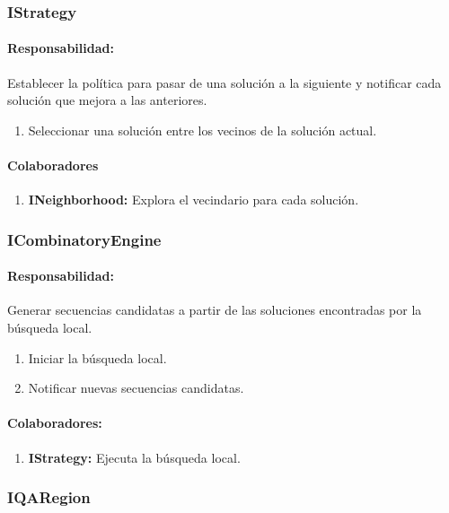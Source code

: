   \subsubsection{IStrategy}
    \paragraph{Responsabilidad:} Establecer la pol\'itica para pasar de una
soluci\'on a la siguiente y notificar cada soluci\'on que mejora a las
anteriores.
      \begin{enumerate}       
       \item Seleccionar una soluci\'on entre los vecinos de la soluci\'on
actual.
      \end{enumerate}
   \paragraph{Colaboradores}
    \begin{enumerate}
     \item \textbf{INeighborhood:} Explora el vecindario para cada soluci\'on. 
    \end{enumerate}

  \subsubsection{ICombinatoryEngine}
    \paragraph{Responsabilidad:} Generar secuencias candidatas a partir de las
soluciones encontradas por la b\'usqueda local.
      \begin{enumerate}       
       \item Iniciar la b\'usqueda local.
       \item Notificar nuevas secuencias candidatas.
      \end{enumerate}
    \paragraph{Colaboradores:}
      \begin{enumerate}       
       \item \textbf{IStrategy:} Ejecuta la b\'usqueda local.
      \end{enumerate} 

  \subsubsection{IQARegion}
